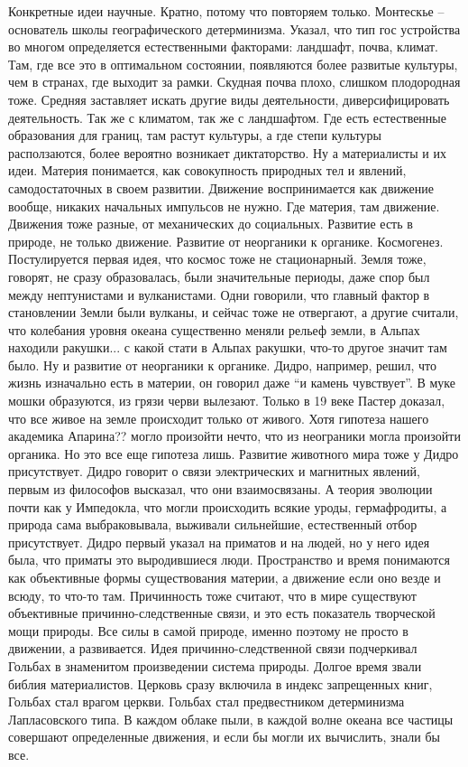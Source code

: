 \documentclass[a4paper, 12pt]{article}
\begin{document}
Конкретные идеи научные. Кратно, потому что повторяем только. Монтескье 
-- основатель школы географического детерминизма. Указал, что тип гос 
устройства во многом определяется естественными факторами: ландшафт, 
почва, климат. Там, где все это в оптимальном состоянии, появляются 
более развитые культуры, чем в странах, где выходит за рамки. Скудная 
почва плохо, слишком плодородная тоже. Средняя заставляет искать другие 
виды деятельности, диверсифицировать деятельность. Так же с климатом, 
так же с ландшафтом. Где есть естественные образования для границ, там 
растут культуры, а где степи культуры расползаются, более вероятно 
возникает диктаторство. Ну а материалисты и их идеи. Материя понимается, 
как совокупность природных тел и явлений, самодостаточных в своем 
развитии. Движение воспринимается как движение вообще, никаких начальных 
импульсов не нужно. Где материя, там движение. Движения тоже разные, от 
механических до социальных. Развитие есть в природе, не только движение. 
Развитие от неорганики к органике. Космогенез. Постулируется первая 
идея, что космос тоже не стационарный. Земля тоже, говорят, не сразу 
образовалась, были значительные периоды, даже спор был между 
нептунистами и вулканистами. Одни говорили, что главный фактор 
в становлении Земли были вулканы, и сейчас тоже не отвергают, а другие 
считали, что колебания уровня океана существенно меняли рельеф земли, 
в Альпах находили ракушки... с какой стати в Альпах ракушки, что-то 
другое значит там было. Ну и развитие от неорганики к органике. Дидро, 
например, решил, что жизнь изначально есть в материи, он говорил даже 
``и камень чувствует''. В муке мошки образуются, из грязи черви 
вылезают. Только в 19 веке Пастер доказал, что все живое на земле 
происходит только от живого. Хотя гипотеза нашего академика Апарина?? 
могло произойти нечто, что из неограники могла произойти органика. Но 
это все еще гипотеза лишь. Развитие животного мира тоже у Дидро 
присутствует. Дидро говорит о связи электрических и магнитных явлений, 
первым из философов высказал, что они взаимосвязаны. А теория эволюции 
почти как у Импедокла, что могли происходить всякие уроды, гермафродиты, 
а природа сама выбраковывала, выживали сильнейшие, естественный отбор 
присутствует. Дидро первый указал на приматов и на людей, но у него идея 
была, что приматы это выродившиеся люди. Пространство и время понимаются 
как объективные формы существования материи, а движение если оно везде 
и всюду, то что-то там. Причинность тоже считают, что в мире существуют 
объективные причинно-следственные связи, и это есть показатель 
творческой мощи природы. Все силы в самой природе, именно поэтому не 
просто в движении, а развивается. Идея причинно-следственной связи 
подчеркивал Гольбах в знаменитом произведении система природы. Долгое 
время звали библия материалистов. Церковь сразу включила в индекс 
запрещенных книг, Гольбах стал врагом церкви. Гольбах стал предвестником 
детерминизма Лапласовского типа. В каждом облаке пыли, в каждой волне 
океана все частицы совершают определенные движения, и если бы могли их 
вычислить, знали бы все.
\end{document}
